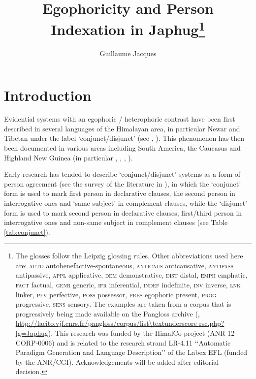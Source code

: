 \documentclass[oldfontcommands,oneside,a4paper,11pt]{article}
\begin{document}
 
\title{Egophoricity and Person Indexation in Japhug\footnote{ The glosses follow the Leipzig glossing rules. Other abbreviations used here are: \textsc{auto}  autobenefactive-spontaneous, \textsc{anticaus} anticausative, \textsc{antipass} antipassive, \textsc{appl} applicative, \textsc{dem} demonstrative,  \textsc{dist} distal, \textsc{emph} emphatic, \textsc{fact} factual, \textsc{genr} generic, \textsc{ifr} inferential, \textsc{indef} indefinite, \textsc{inv} inverse,  \textsc{lnk} linker, \textsc{pfv} perfective, \textsc{poss} possessor, \textsc{pres} egophoric present, \textsc{prog} progressive, \textsc{sens} sensory. The examples are taken from a corpus that is progressively being made available on the Pangloss archive  (\citealt{michailovsky14pangloss}, 
 \url{http://lacito.vjf.cnrs.fr/pangloss/corpus/list\textunderscore rsc.php?lg=Japhug}). This research was funded by the HimalCo project (ANR-12-CORP-0006) and is related to the research strand LR-4.11 ‘‘Automatic Paradigm Generation and Language Description’’ of the Labex EFL (funded by the ANR/CGI). Acknowledgements   will be added after editorial decision. %
} }
\author{Guillaume Jacques}
\maketitle


\sloppy
\section*{Introduction}
Evidential systems with an egophoric / heterophoric contrast have been first described in several languages of the Himalayan area, in particular Newar and Tibetan under the label `conjunct/disjunct' (see \citealt{hale80conjunct}, \citealt{delancey92conjunct}). This phenomenon has then been documented in various areas including South America, the Caucasus and Highland New Guinea (in particular \citealt{creissels08akhvakh}, \citealt{curnow02conjunct}, \citealt{sanroque12evidentiality}, \citealt{sanroque15interrogativity}). 

Early research has tended to describe `conjunct/disjunct' systems as a form of person agreement (see the survey of the literature in \citealt{hill17evidential}), in which the `conjunct' form is used to mark first person in declarative clauses, the second person in interrogative ones and `same subject' in complement clauses, while the `disjunct' form is used to mark second person in declarative clauses, first/third person in interrogative ones and non-same subject in complement clauses (see Table \ref{tab:conjunct}).
\end{document}
